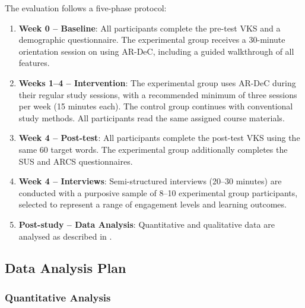 The evaluation follows a five-phase protocol:

\begin{enumerate}
    \item \textbf{Week 0 -- Baseline}: All participants complete the pre-test VKS and a demographic questionnaire. The experimental group receives a 30-minute orientation session on using AR-DeC, including a guided walkthrough of all features.

    \item \textbf{Weeks 1--4 -- Intervention}: The experimental group uses AR-DeC during their regular study sessions, with a recommended minimum of three sessions per week (15 minutes each). The control group continues with conventional study methods. All participants read the same assigned course materials.

    \item \textbf{Week 4 -- Post-test}: All participants complete the post-test VKS using the same 60 target words. The experimental group additionally completes the SUS and ARCS questionnaires.

    \item \textbf{Week 4 -- Interviews}: Semi-structured interviews (20--30 minutes) are conducted with a purposive sample of 8--10 experimental group participants, selected to represent a range of engagement levels and learning outcomes.

    \item \textbf{Post-study -- Data Analysis}: Quantitative and qualitative data are analysed as described in .
\end{enumerate}

\subsection{Data Analysis Plan}
\label{subsec:data_analysis}

\subsubsection{Quantitative Analysis}

